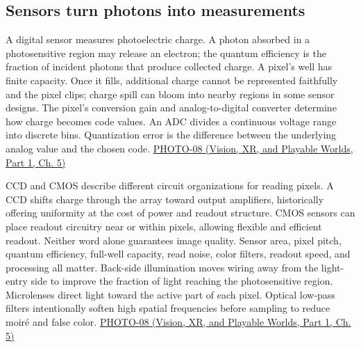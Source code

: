 \subsection{Sensors turn photons into measurements}\label{03-visual-computing-i-ch003-sensors-turn-photons-into-measurements}

\hypertarget{03-visual-computing-i-ch003-sensors-turn-photons-into-measurements}{}

A digital sensor measures photoelectric charge. A photon absorbed in a photosensitive region may release an electron; the quantum efficiency is the fraction of incident photons that produce collected charge. A pixel's well has finite capacity. Once it fills, additional charge cannot be represented faithfully and the pixel clips; charge spill can bloom into nearby regions in some sensor designs. The pixel's conversion gain and analog-to-digital converter determine how charge becomes code values. An ADC divides a continuous voltage range into discrete bins. Quantization error is the difference between the underlying analog value and the chosen code. \href{../07-Vision-XR-and-Playable-Worlds-P01/main.pdf\#nameddest=04-visual-computing-ii-ch036-photo-08---photography-session-08}{PHOTO-08 (Vision, XR, and Playable Worlds, Part 1, Ch. 5)}

CCD and CMOS describe different circuit organizations for reading pixels. A CCD shifts charge through the array toward output amplifiers, historically offering uniformity at the cost of power and readout structure. CMOS sensors can place readout circuitry near or within pixels, allowing flexible and efficient readout. Neither word alone guarantees image quality. Sensor area, pixel pitch, quantum efficiency, full-well capacity, read noise, color filters, readout speed, and processing all matter. Back-side illumination moves wiring away from the light-entry side to improve the fraction of light reaching the photosensitive region. Microlenses direct light toward the active part of each pixel. Optical low-pass filters intentionally soften high spatial frequencies before sampling to reduce moiré and false color. \href{../07-Vision-XR-and-Playable-Worlds-P01/main.pdf\#nameddest=04-visual-computing-ii-ch036-photo-08---photography-session-08}{PHOTO-08 (Vision, XR, and Playable Worlds, Part 1, Ch. 5)}

